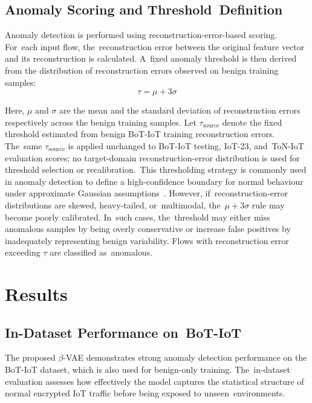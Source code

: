 \documentclass[futureinternet,article,accept,moreauthors]{Definitions/mdpi}
\begin{document}
\subsection{Anomaly Scoring and Threshold~Definition}

Anomaly detection is performed using reconstruction-error-based scoring. For~each input flow, the~reconstruction error between the original feature vector and its reconstruction is calculated. A~fixed anomaly threshold is then derived from the distribution of reconstruction errors observed on benign training samples:
\begin{equation}
\tau = \mu + 3\sigma
\end{equation}

Here, $\mu$ and $\sigma$ are the mean and the standard deviation of reconstruction errors respectively across the benign training samples. Let $\tau_{\text{source}}$ denote the fixed threshold estimated from benign BoT-IoT training reconstruction errors. The~same $\tau_{\text{source}}$ is applied unchanged to BoT-IoT testing, IoT-23, and~ToN-IoT evaluation scores; no target-domain reconstruction-error distribution is used for threshold selection or recalibration.~This thresholding strategy is commonly used in anomaly detection to define a high-confidence boundary for normal behaviour under approximate Gaussian assumptions~\cite{chandola2009}. However, if~reconstruction-error distributions are skewed, heavy-tailed, or~multimodal, the~\mbox{$\mu + 3\sigma$} rule may become poorly calibrated. In~such cases, the~threshold may either miss anomalous samples by being overly conservative or increase false positives by inadequately representing benign variability. Flows with reconstruction error exceeding $\tau$ are classified as~anomalous.

\section{Results} \label{sec5}
\unskip

\subsection{In-Dataset Performance on~BoT-IoT}

The proposed $\beta$-VAE demonstrates strong anomaly detection performance on the BoT-IoT dataset, which is also used for benign-only training. The~in-dataset evaluation assesses how effectively the model captures the statistical structure of normal encrypted IoT traffic before being exposed to unseen~environments.
\end{document}
